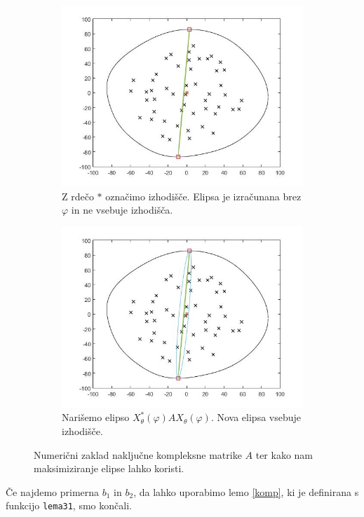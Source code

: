 \documentclass[12pt,a4paper]{amsart}
\theoremstyle{definition}
\theoremstyle{plain}
\begin{document}
\begin{figure}[H]
\renewcommand*\thesubfigure{\Alph{subfigure}}
\begin{subfigure}[t]{0.45\textwidth}
\includegraphics[width=0.9\linewidth]{brez-fi.jpg}
\caption{Z rdečo $\ast$ označimo izhodišče. Elipsa je izračunana brez $\varphi$ in ne vsebuje izhodišča.}
\end{subfigure}
\hfill
\begin{subfigure}[t]{0.45\textwidth}
\includegraphics[width=0.9\linewidth]{fi.jpg}
\caption{Narišemo elipso $X_\theta ^\ast (\varphi) A X_\theta (\varphi)$. Nova elipsa vsebuje izhodišče.}
\label{fig:fi}
\end{subfigure}

\caption{Numerični zaklad naključne kompleksne matrike $A$ ter kako nam maksimiziranje elipse lahko koristi.}

\end{figure}
Če najdemo primerna $b_1$ in $b_2$, da lahko uporabimo lemo \ref{komp}, ki je definirana s funkcijo \verb+lema31+, smo končali.
\end{document}
